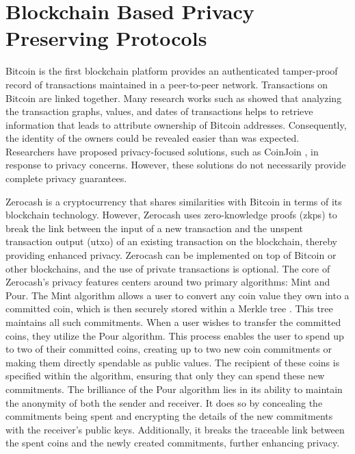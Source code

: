 
\section{Blockchain Based Privacy Preserving Protocols}

Bitcoin \cite{nakamoto2008bitcoin} is the first blockchain platform provides an authenticated tamper-proof record of transactions maintained in a peer-to-peer network. Transactions on Bitcoin are linked together. Many research works such as \cite{Reid2013, Ron2013, Meiklejohn2016} showed that analyzing the transaction graphs, values, and dates of transactions helps to retrieve information that leads to attribute ownership of Bitcoin addresses. Consequently, the identity of the owners could be revealed easier than was expected. Researchers have proposed privacy-focused solutions, such as CoinJoin \cite{coinjoin}, in response to privacy concerns. However, these solutions do not necessarily provide complete privacy guarantees.

Zerocash \cite{zcash-proc} is a cryptocurrency that shares similarities with Bitcoin in terms of its blockchain technology. However, Zerocash uses zero-knowledge proofs (\glspl{zkp}) to break the link between the input of a new transaction and the unspent transaction output (\gls{utxo}) of an existing transaction on the blockchain, thereby providing enhanced privacy. Zerocash can be implemented on top of Bitcoin or other blockchains, and the use of private transactions is optional.
The core of Zerocash's privacy features centers around two primary algorithms: \textsf{Mint} and \textsf{Pour}. The \textsf{Mint} algorithm allows a user to convert any coin value they own into a committed coin, which is then securely stored within a Merkle tree \cite{Merkle1980}. This tree maintains all such commitments. When a user wishes to transfer the committed coins, they utilize the \textsf{Pour} algorithm. This process enables the user to spend up to two of their committed coins, creating up to two new coin commitments or making them directly spendable as public values. The recipient of these coins is specified within the algorithm, ensuring that only they can spend these new commitments. The brilliance of the \textsf{Pour} algorithm lies in its ability to maintain the anonymity of both the sender and receiver. It does so by concealing the commitments being spent and encrypting the details of the new commitments with the receiver's public keys. Additionally, it breaks the traceable link between the spent coins and the newly created commitments, further enhancing privacy.



